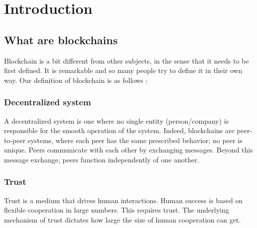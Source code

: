 \chapter{Introduction}
\section{What are blockchains}
Blockchain is a bit different from other subjects, in the sense that it needs to be first defined. It is remarkable and so many people try to define it in their own way. Our definition of blockchain is as follows :

\subsection*{Decentralized system}
A decentralized system is one where no single entity (person/company)
is responsible for the smooth operation of the system. Indeed, blockchains are peer-to-peer systems,
where each peer has the same prescribed behavior; no peer is unique. Peers communicate with each
other by exchanging messages. Beyond this message exchange, peers function independently of one
another.

\subsection*{Trust}
Trust is a medium that drives human interactions. Human success is based on flexible cooperation in large numbers. This requires trust. The underlying mechanism of trust dictates how large the size of human cooperation can get. 
